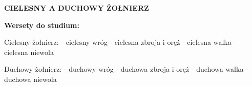 \documentclass[10pt,a4paper,oneside]{article}
\begin{document}
\centerline{\textbf{\MakeUppercase{Cielesny a duchowy żołnierz}}}
\begin{center}
\textbf{Wersety do studium:} 
\end{center}
Cielesny żołnierz:
- cielesny wróg
- cielesna zbroja i oręż
- cielesna walka
- cielesna niewola

Duchowy żołnierz:
- duchowy wróg
- duchowa zbroja i oręż
- duchowa walka
- duchowa niewola
\end{document}

